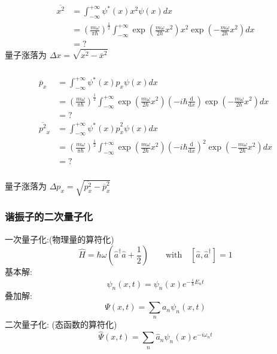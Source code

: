 \begin{frame}
    \frametitle{}
    \[\begin{aligned}
        \overline{x^2} & = \int_{-\infty}^{+\infty} \psi^{*}(x) x^2 \psi(x) d x  \\ 
        &= (\frac{m \omega }{\pi  \hbar})^{\frac{1}{2}}  \int_{-\infty}^{+\infty} \exp(\frac{m \omega }{2 \hbar} x^2) x^2 \exp(- \frac{m \omega }{2 \hbar} x^2) d x  \\ 
        &= ? 
    \end{aligned} \]
    量子涨落为 $\Delta x  = \sqrt{ \overline{x^2}- \overline{x}^2}$ \\ 
\end{frame}

\begin{frame}
    \frametitle{}
    \[\begin{aligned}
        \overline{p}_x & = \int_{-\infty}^{+\infty} \psi^{*}(x) \hat{p}_x \psi(x) d x  \\ 
        &= (\frac{m \omega }{\pi  \hbar})^{\frac{1}{2}}  \int_{-\infty}^{+\infty} \exp(\frac{m \omega }{2 \hbar} x^2) (-i\hbar \frac{\mathrm{d}}{\mathrm{d}x}) \exp(- \frac{m \omega }{2 \hbar} x^2) d x  \\ 
        &= ?  \\
        \overline{p^2}_x & = \int_{-\infty}^{+\infty} \psi^{*}(x) \hat{p}_x ^2 \psi(x) d x  \\ 
        &= (\frac{m \omega }{\pi  \hbar})^{\frac{1}{2}}  \int_{-\infty}^{+\infty} \exp(\frac{m \omega }{2 \hbar} x^2) (-i\hbar \frac{\mathrm{d}}{\mathrm{d}x})^2 \exp(- \frac{m \omega }{2 \hbar} x^2) d x  \\ 
        &= ? 
    \end{aligned} \]
\end{frame}

\begin{frame}
    \frametitle{}
    量子涨落为 $\Delta p_x  = \sqrt{ \overline{p^2 _x}- \overline{p}_x ^2}$ \\ 
\end{frame}

\begin{frame} 
\frametitle{谐振子的二次量子化}
{\Bullet}一次量子化:(物理量的算符化)
\[  \hat{H}= \hbar \omega \left(\hat{a}^\dagger \hat{a} + \frac{1 }{2}\right) \qquad \text{with} \quad [\hat{a},\hat{a}^\dagger]=1 \]
基本解:
\[ \psi_n(x,t) = \psi_n(x)e^{-\frac{i}{\hbar} E_n t }\]  
叠加解:
\[ \Psi (x,t) = \sum_n a_n \psi_n(x,t)\] 
{\Bullet}二次量子化: (态函数的算符化)
\[ \hat{\Psi } (x,t) = \sum_n \hat{a}_n \psi_n(x) e^{-i \omega_n t}\] 
\end{frame}

